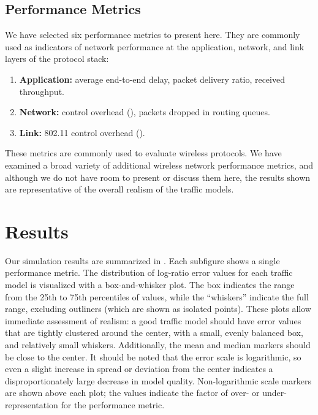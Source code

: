 \documentclass[twocolumn,final]{svjour3}
\begin{document}
\subsection{Performance Metrics}
\label{sec:performance-metrics}

We have selected six performance metrics to present here. They are commonly used as indicators of network performance at the application, network, and link layers of the protocol stack:
\begin{enumerate}
\setlength{\itemsep}{0em}
\item \textbf{Application:} average end-to-end delay, packet delivery ratio, received throughput.
\item \textbf{Network:}  control overhead (), packets dropped in routing queues.
\item \textbf{Link:} 802.11 control overhead ().
\end{enumerate}
These metrics are commonly used to evaluate wireless protocols. We have examined a broad variety of additional wireless network performance metrics, and although we do not have room to present or discuss them here, the results shown are representative of the overall realism of the traffic models.

\section{Results}
\label{sec:results}



Our simulation results are summarized in . Each subfigure shows a single performance metric. The distribution of log-ratio error values for each traffic model is visualized with a box-and-whisker plot. The box indicates the range from the 25th to 75th percentiles of values, while the ``whiskers'' indicate the full range, excluding outliners (which are shown as isolated points). These plots allow immediate assessment of realism: a good traffic model should have error values that are tightly clustered around the center, with a small, evenly balanced box, and relatively small whiskers. Additionally, the mean and median markers should be close to the center. It should be noted that the error scale is logarithmic, so even a slight increase in spread or deviation from the center indicates a disproportionately large decrease in model quality. Non-logarithmic scale markers are shown above each plot; the values indicate the factor of over- or under-representation for the performance metric.
\end{document}
